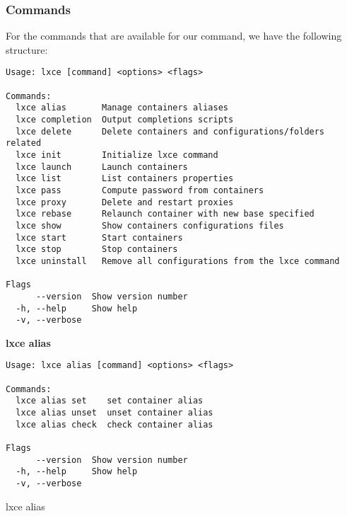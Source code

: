 \newpage
\subsubsection{Commands}
For the commands that are available for our command, we have the following structure:
\begin{verbatim}
Usage: lxce [command] <options> <flags>

Commands:
  lxce alias       Manage containers aliases
  lxce completion  Output completions scripts
  lxce delete      Delete containers and configurations/folders related
  lxce init        Initialize lxce command
  lxce launch      Launch containers
  lxce list        List containers properties
  lxce pass        Compute password from containers
  lxce proxy       Delete and restart proxies 
  lxce rebase      Relaunch container with new base specified
  lxce show        Show containers configurations files
  lxce start       Start containers
  lxce stop        Stop containers
  lxce uninstall   Remove all configurations from the lxce command

Flags
      --version  Show version number        
  -h, --help     Show help                 
  -v, --verbose
\end{verbatim}

\newpage
\textbf{lxce alias}
\begin{listing}[H]
\begin{verbatim}
Usage: lxce alias [command] <options> <flags>

Commands:
  lxce alias set    set container alias
  lxce alias unset  unset container alias
  lxce alias check  check container alias

Flags
      --version  Show version number                                   
  -h, --help     Show help                                             
  -v, --verbose
\end{verbatim}
\caption{lxce alias}
\label{listings: lxce alias}
\end{listing}

